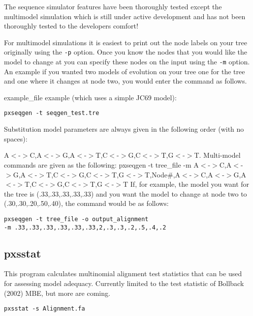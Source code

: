 \documentclass[12pt,letterpaper]{memoir}
\begin{document}
The sequence simulator features have been thoroughly tested except the multimodel simulation which is still under active development and has not been thoroughly tested to the developers comfort!

For multimodel simulations it is easiest to print out the node labels on your tree originally using the \texttt{-p} option. Once you know the nodes that you would like the model to change at you can specify these nodes on the input using the \texttt{-m} option. An example if you wanted two models of evolution on your tree one for the tree and one where it changes at node two, you would enter the command as follows.

\begin{flushleft}
example\_file example (which uses a simple JC69 model):
\begin{verbatim}
pxseqgen -t seqgen_test.tre
\end{verbatim}

Substitution model parameters are always given in the following order (with no spaces):

A$<$-$>$C,A$<$-$>$G,A$<$-$>$T,C$<$-$>$G,C$<$-$>$T,G$<$-$>$T.
\newline
\newline
Multi-model commands are given as the following:
pxseqgen -t tree\_file -m A$<$-$>$C,A$<$-$>$G,A$<$-$>$T,C$<$-$>$G,C$<$-$>$T,G$<$-$>$T,Node\#,A$<$-$>$C,A$<$-$>$G,A$<$-$>$T,C$<$-$>$G,C$<$-$>$T,G$<$-$>$T
\newline
\newline
If, for example, the model you want for the tree is (.33,.33,.33,.33,.33) and you want the model to change at node two to (.30,.30,.20,.50,.40), the command would be as follows: 

\begin{verbatim}
pxseqgen -t tree_file -o output_alignment 
-m .33,.33,.33,.33,.33,.33,2,.3,.3,.2,.5,.4,.2
\end{verbatim}
\end{flushleft}

\subsection{pxsstat}

This program calculates multinomial alignment test statistics that can be used for assessing model adequacy. Currently limited to the test statistic of Bollback (2002) MBE, but more are coming.

\begin{flushleft}
\begin{verbatim}
pxsstat -s Alignment.fa
\end{verbatim}
\end{flushleft}
\end{document}
